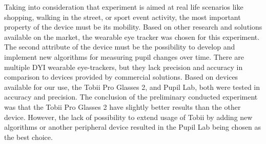 \documentclass[USenglish,twocolumn]{article}
\begin{document}
Taking into consideration that experiment is aimed at real life scenarios like shopping, walking in the street, or sport event activity, the most important property of the device must be its mobility. Based on other research and solutions available on the market, the wearable eye tracker was chosen for this experiment. The second attribute of the device must be the possibility to develop and implement new algorithms for measuring pupil changes over time. There are multiple DYI wearable eye-trackers, but they lack precision and accuracy in comparison to devices provided by commercial solutions. Based on devices available for our use, the Tobii Pro Glasses 2, and Pupil Lab, both were tested in accuracy and precision. The conclusion of the preliminary conducted experiment was that the Tobii Pro Glasses 2 have slightly better results than the other device. However, the lack of possibility to extend usage of Tobii by adding new algorithms or another peripheral device resulted in the Pupil Lab being chosen as the best choice.
\end{document}
